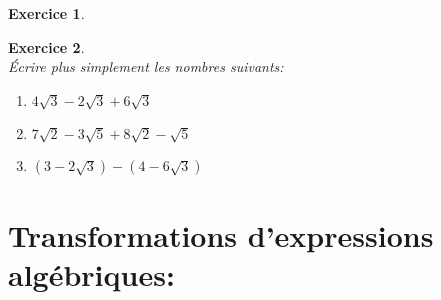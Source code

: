 \documentclass[a4paper,10pt]{article}
\newtheorem{exer}{Exercice}
\begin{document}
\begin{minipage}[t]{1\linewidth}
\begin{minipage}[t]{0.4\linewidth}
\begin{exer}
	
		\end{exer}
		\begin{exer}\quad\hfill\textbf{}\\
			Écrire plus simplement les nombres suivants: \\
			
				\begin{enumerate}
				\item $4\sqrt{3}-2\sqrt{3}+6\sqrt{3} $
				\item $7\sqrt{2}-3\sqrt{5}+8\sqrt{2}-\sqrt{5}$
				 
				\item $(3-2\sqrt{3})-(4-6\sqrt{3})$
				\end{enumerate}			
		\end{exer}
	\end{minipage}
\end{minipage}


\newpage

\section*{Transformations d'expressions algébriques:}
\quad \\
\end{document}
